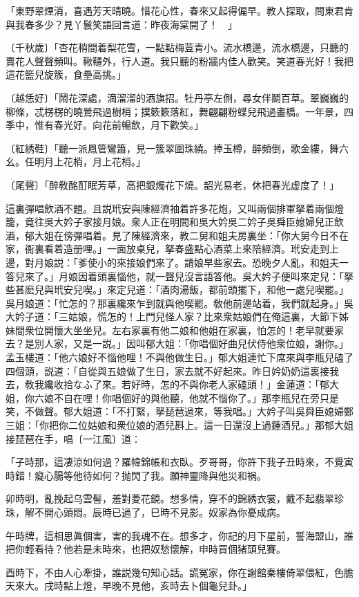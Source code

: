 \begin{myquote}
「東野翠煙消，喜遇芳天晴曉。惜花心性，春來又起得偏早。教人探取，問東君肯與我春多少？見丫鬟笑語回言道：昨夜海棠開了！　」

{\markfont〔千秋歲〕}「杏花稍間着梨花雪，一點點梅荳青小。流水橋邊，流水橋邊，只聽的賣花人聲聲頻叫。鞦韆外，行人道。我只聽的粉牆内佳人歡笑。笑道春光好！我把這花籃兒旋簇，食壘高挑。」

{\markfont〔越恁好〕}「鬧花深處，滴溜溜的酒旗招。牡丹亭左側，尋女伴鬬百草。翠巍巍的柳條，忒楞楞的曉鶯飛過樹梢；撲簌簌落紅，舞翩翩粉蝶兒飛過畫橋。一年景，四季中，惟有春光好。向花前暢飲，月下歡笑。」

{\markfont〔紅綉鞋〕}「聽一派鳳管鸞簫，見一簇翠圍珠繞。捧玉樽，醉頻倒，歌金縷，舞六幺。任明月上花梢，月上花梢。」

{\markfont〔尾聲〕}「醉敎酩酊眠芳草，高把銀燭花下燒。韶光易老，休把春光虚度了！」
\end{myquote}

這裏彈唱飲酒不題。且説玳安與陳經濟袖着許多花炮，又叫兩個排軍拏着兩個燈籠，竟往吳大妗子家接月娘。衆人正在明間和吳大妗吳二妗子吳舜臣媳婦兒正飲酒，郁大姐在傍彈唱着。見了陳經濟來，教二舅和姐夫房裏坐：「你大舅今日不在家，衙裏看着造册哩。」一面放桌兒，拏春盛點心酒菜上來陪經濟。玳安走到上邊，對月娘説：「爹使小的來接娘們來了。請娘早些家去。恐晚夕人亂，和姐夫一答兒來了。」月娘因着頭裏惱他，就一聲兒沒言語答他。吳大妗子便叫來定兒：「拏些甚麽兒與玳安兒喫。」來定兒道：「酒肉湯飯，都前頭擺下，和他一處兒喫罷。」吳月娘道：「忙怎的？那裏纔來乍到就與他喫罷。敎他前邊站着，我們就起身。」吳大妗子道：「三姑娘，慌怎的！上門兒怪人家？比來衆姑娘們在俺這裏，大節下姊妹間衆位開懷大坐坐兒。左右家裏有他二娘和他姐在家裏，怕怎的！老早就要家去？是別人家，又是一説。」因叫郁大姐：「你唱個好曲兒伏侍他衆位娘，謝你。」孟玉樓道：「他六娘好不惱他哩！不與他做生日。」郁大姐連忙下席來與李瓶兒磕了四個頭，説道：「自從與五娘做了生日，家去就不好起來。昨日妗奶奶這裏接我去，敎我纔收拾なふ了來。若好時，怎的不與你老人家磕頭！」金蓮道：「郁大姐，你六娘不自在哩！你唱個好的與他聽，他就不惱你了。」那李瓶兒在旁只是笑，不做聲。郁大姐道：「不打緊，拏琵琶過來，等我唱。」大妗子叫吳舜臣媳婦鄭三姐：「你把你二位姑娘和衆位娘的酒兒斟上。這一日還沒上過鍾酒兒。」那郁大姐接琵琶在手，唱〔一江風〕道：

\begin{myquote}
「子時那，這凄涼如何過？羅幃錦帳和衣臥。歹哥哥，你許下我子丑時來，不覺寅時錯！癡心腸等他待如何？抛閃了我。願神靈降與他災和祸。

卯時明，亂挽起乌雲髻，羞對菱花鏡。想多情，穿不的錦綉衣裳，戴不起翡翠珍珠，解不開心頭悶。辰時已過了，巳時不見影。奴家為你憂成病。

午時牌，這相思眞個害，害的我魂不在。想多才，你記的月下星前，誓海盟山，誰把你輕看待？他若是未時來，也把奴愁懷解，申時買個猪頭兒賽。

酉時下，不由人心牽掛，誰説幾句知心話。謊冤家，你在謝館秦樓倚翠偎紅，色膽天來大。戌時點上燈，早晚不見他，亥時去卜個龜兒卦。」
\end{myquote}

